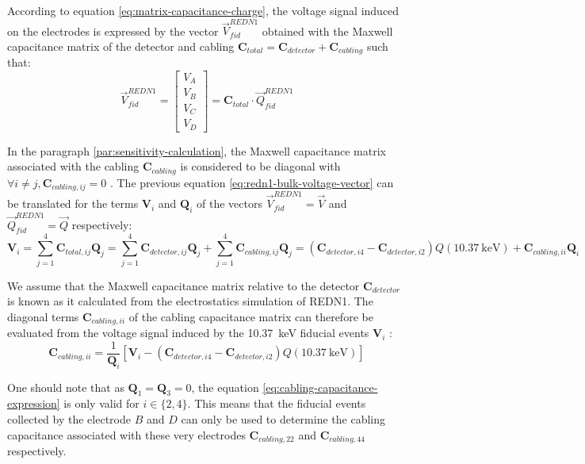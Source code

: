According to equation \ref{eq:matrix-capacitance-charge}, the voltage signal induced on the electrodes is expressed by the vector $\vec{V}_{fid}^{REDN1}$ obtained with the Maxwell capacitance matrix  of the detector and cabling $\bm{C}_{total} = \bm{C}_{detector} + \bm{C}_{cabling}$ such that:
\begin{equation}
\label{eq:redn1-bulk-voltage-vector}
\vec{V}_{fid}^{REDN1}
=
\begin{bmatrix}
V_A \\ V_B \\ V_C \\ V_D
\end{bmatrix}
=
\bm{C}_{total}
\cdot
\vec{Q}_{fid}^{REDN1}
\end{equation}

In the paragraph \ref{par:sensitivity-calculation}, the Maxwell capacitance matrix associated with the cabling $\bm{C}_{cabling}$ is considered to be diagonal with $\forall i \neq j, \bm{C}_{cabling, ij} = 0$ . The previous equation \ref{eq:redn1-bulk-voltage-vector} can be translated for the terms $\bm{V}_{i}$ and $\bm{Q}_i$ of the vectors $\vec{V}_{fid}^{REDN1}=\vec{V}$ and $\vec{Q}_{fid}^{REDN1}=\vec{Q}$ respectively:
\begin{equation}
\bm{V}_{i}
=
\sum_{j=1}^4 \bm{C}_{total, ij} \bm{Q}_j
=
\sum_{j=1}^4 \bm{C}_{detector, ij} \bm{Q}_j + \sum_{j=1}^4 \bm{C}_{cabling, ij} \bm{Q}_j
=
\left( \bm{C}_{detector, i4} - \bm{C}_{detector, i2} \right) Q(\SI{10.37}{\kilo\eV}) + \bm{C}_{cabling, ii} \bm{Q}_i
\end{equation}

We assume that the Maxwell capacitance matrix relative to the detector $\bm{C}_{detector}$ is known as it calculated from the electrostatics simulation of REDN1. The diagonal terms $\bm{C}_{cabling, ii}$ of the cabling capacitance matrix can therefore be evaluated from the voltage signal induced by the \SI{10.37}{\kilo\eV} fiducial events $\bm{V}_{i}$ :
\begin{equation}
\label{eq:cabling-capacitance-expression}
\bm{C}_{cabling, ii}
=
\frac{1}{\bm{Q}_i} \left[ \bm{V}_{i} - \left( \bm{C}_{detector, i4} - \bm{C}_{detector, i2} \right) Q(\SI{10.37}{\kilo\eV}) \right]
\end{equation}

One should note that as $\bm{Q}_1 = \bm{Q}_3 = 0$, the equation \ref{eq:cabling-capacitance-expression} is only valid for $i \in \{ 2,4 \}$. This means that the fiducial events collected by the electrode $B$ and $D$ can only be used to determine the cabling capacitance associated with these very electrodes $\bm{C}_{cabling, 22}$ and $\bm{C}_{cabling, 44}$ respectively.


